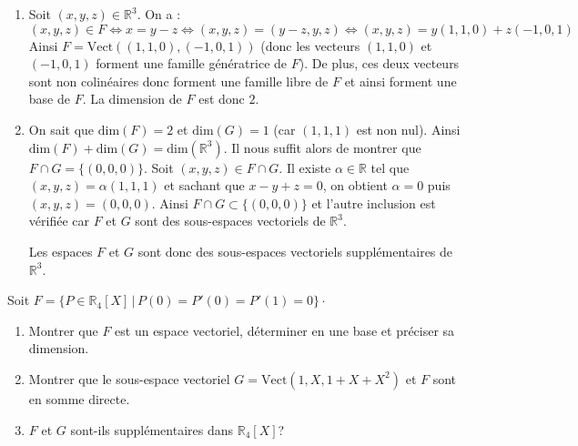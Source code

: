 \documentclass[a4paper,10pt]{report}
\begin{document}
\corr \begin{enumerate}
\item Soit $(x,y,z) \in \mathbb{R}^3$. On a :
$$ (x,y,z) \in F \Longleftrightarrow x=y-z \Longleftrightarrow (x,y,z) = (y-z,y,z) \Longleftrightarrow (x,y,z) = y(1,1,0) + z(-1,0,1)$$
Ainsi $F = \textrm{Vect}((1,1,0), (-1,0,1))$ (donc les vecteurs $(1,1,0)$ et $(-1,0,1)$ forment une famille génératrice de $F$). De plus, ces deux vecteurs sont non colinéaires donc forment une famille libre de $F$ et ainsi forment une base de $F$. La dimension de $F$ est donc $2$.
\item On sait que $\textrm{dim}(F)=2$ et $\textrm{dim}(G)=1$ (car $(1,1,1)$ est non nul). Ainsi $\textrm{dim}(F) + \textrm{dim}(G) = \textrm{dim}(\mathbb{R}^3)$. Il nous suffit alors de montrer que $F \cap G = \lbrace (0,0,0) \rbrace$. Soit $(x,y,z) \in F \cap G$. Il existe $\alpha \in \mathbb{R}$ tel que $(x,y,z) = \alpha (1,1,1)$ et sachant que $x-y+z=0$, on obtient $\alpha = 0$ puis $(x,y,z)=(0,0,0)$. Ainsi $F \cap G \subset \lbrace (0,0,0) \rbrace$ et l'autre inclusion est vérifiée car $F$ et $G$ sont des sous-espaces vectoriels de $\mathbb{R}^3$.

\medskip

\noindent Les espaces $F$ et $G$ sont donc des sous-espaces vectoriels supplémentaires de $\mathbb{R}^3$.
\end{enumerate}

\medskip


\begin{Exercice}{} Soit $F = \lbrace P \in \mathbb{R}_4[X] \, \vert \, P(0)=P'(0)=P'(1)=0 \rbrace \cdot$

\begin{enumerate}
\item Montrer que $F$ est un espace vectoriel, déterminer en une base et préciser sa dimension.
\item Montrer que le sous-espace vectoriel $G= \textrm{Vect}(1,X,1+X+X^2)$ et $F$  sont en somme directe.
\item $F$ et $G$ sont-ils supplémentaires dans $\mathbb{R}_4[X]$?
\end{enumerate}
\end{Exercice}

\corr 
\end{document}
